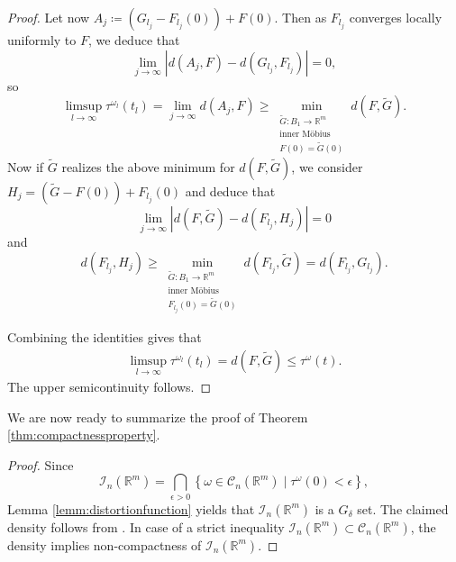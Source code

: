 \documentclass[a4paper,leqno,11pt]{amsart}
\numberwithin{equation}{section}
\theoremstyle{remark}
\theoremstyle{remark}
\newcommand{\R}{\mathbb{R}}
\begin{document}
\begin{proof}
Let now $A_{ j } \coloneqq ( G_{ l_j } - F_{ l_j }( 0 ) ) + F(0)$. Then as $F_{ l_j }$ converges locally uniformly to $F$, we deduce that
\begin{equation*}
    \lim_{ j \rightarrow \infty } | d( A_j, F ) - d( G_{ l_j }, F_{ l_j } ) | = 0,
\end{equation*}
so
\begin{equation*}
    \limsup_{ l \rightarrow \infty } \tau^{ \omega_{ l } }(t_l)
    =
    \lim_{ j \rightarrow \infty }
    d( A_j, F )
    \geq
    \min_{ \substack{ \widetilde{G} \colon B_1 \to \R^m \\ \text{inner Möbius} \\ F(0) = \widetilde{G}(0) } } d( F, \widetilde{G} ).
\end{equation*}
Now if $\widetilde{G}$ realizes the above minimum for $d( F, \widetilde{G} )$, we consider $H_j = ( \widetilde{G} - F(0) ) + F_{ l_j }( 0 )$ and deduce that
\[
    \lim_{ j \rightarrow \infty }
    \left| d( F, \widetilde{G} ) - d( F_{ l_j }, H_j ) \right| 
    =
    0
\]
and
\[
    d( F_{ l_j }, H_j )
    \geq
    \min_{ \substack{ \widetilde{G} \colon B_1 \to \R^m \\ \text{inner Möbius} \\ F_{ l_j }(0) = \widetilde{G}(0) } } d( F_{ l_j }, \widetilde{G} )
    =
    d( F_{ l_j }, G_{ l_j } ).
\]

Combining the identities gives that
\begin{align*}
    \limsup_{ l \rightarrow \infty } \tau^{ \omega_l }(t_l)
    =
    d( F, \widetilde{G} )
    \leq
    \tau^{ \omega }(t).
\end{align*}
The upper semicontinuity follows.
\end{proof}


We are now ready to summarize the proof of Theorem \ref{thm:compactnessproperty}.

\compactness*


\begin{proof}
Since
\[
\mathcal{I}_{n}( \R^m ) = \bigcap_{ \epsilon > 0 } \left\{ \omega \in \mathcal{C}_{n}( \R^m ) \mid \tau^{\omega}(0) < \epsilon \right\},
\]
Lemma \ref{lemm:distortionfunction} yields that $\mathcal{I}_n(\R^m)$ is a $G_\delta$ set. The claimed density follows from 
. In case of a strict inequality $\mathcal{I}_n( \R^m ) \subset \mathcal{C}_n( \R^m )$, the density implies non-compactness of $\mathcal{I}_n( \R^m )$.
\end{proof}
\end{document}
